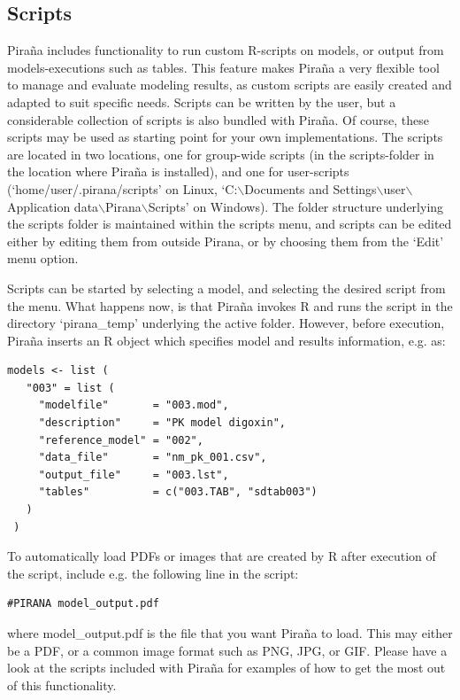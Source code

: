 \documentclass[a4,11pt]{report} \usepackage[pdftex]{graphicx}
\begin{document}
{{\subsection{Scripts}
Pira\~na includes functionality to run custom R-scripts on models, or
output from models-executions such as tables. This feature makes
Pira\~na a very flexible tool to manage and evaluate modeling results,
as custom scripts are easily created and adapted to suit specific
needs. Scripts can be written by the user, but a considerable
collection of scripts is also bundled with Pira\~na. Of course, these
scripts may be used as starting point for your own
implementations. The scripts are located in two locations, one for
group-wide scripts (in the scripts-folder in the location where
Pira\~na is installed), and one for user-scripts
(`home/user/.pirana/scripts' on Linux, `C:$\backslash$Documents and
Settings$\backslash$user$\backslash$Application
data$\backslash$Pirana$\backslash$Scripts' on Windows). The folder
structure underlying the scripts folder is maintained within the
scripts menu, and scripts can be edited either by editing them from
outside Pirana, or by choosing them from the `Edit' menu option.

Scripts can be started by selecting a model, and selecting the desired
script from the menu. What happens now, is that Pira\~na invokes R and
runs the script in the directory `pirana\_temp' underlying the active
folder.  However, before execution, Pira\~na inserts an R object which
specifies model and results information, e.g. as:

\begin{verbatim}
models <- list (
   "003" = list (
     "modelfile"       = "003.mod",
     "description"     = "PK model digoxin",
     "reference_model" = "002",
     "data_file"       = "nm_pk_001.csv",
     "output_file"     = "003.lst",
     "tables"          = c("003.TAB", "sdtab003")
   )
 )
\end{verbatim}

\vspace{15pt} \noindent To automatically load PDFs or images that are created by
R after execution of the script, include e.g. the following line in
the script:

\begin{verbatim}
#PIRANA model_output.pdf
\end{verbatim}

\noindent where model\_output.pdf is the file that you want Pira\~na
to load. This may either be a PDF, or a common image format such as
PNG, JPG, or GIF. Please have a look at the scripts included with
Pira\~na for examples of how to get the most out of this
functionality.


}}
\end{document}
